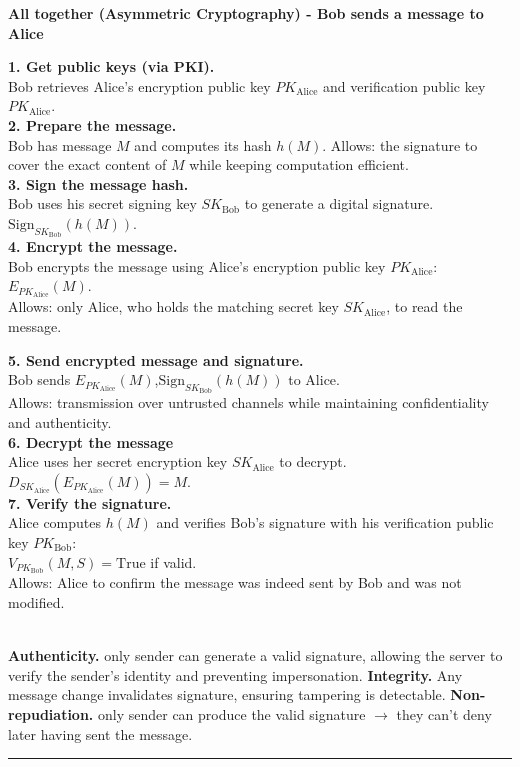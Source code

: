 \documentclass[9pt, a4paper]{extarticle}
\makeatletter
\renewcommand{\hline}{\noalign{\vskip 2px}\hrule\@height\arrayrulewidth\@width\linewidth\noalign{\vskip 2px}}
\makeatother
\begin{document}
\begin{minipage}[t]{0.495\textwidth}
	\textbf{All together (Asymmetric Cryptography) - Bob sends a message to Alice}\\
	\begin{minipage}[t]{0.49\textwidth}
		\textbf{1. Get public keys (via PKI).}\\
		Bob retrieves Alice’s encryption public key $PK_{\text{Alice}}$ and verification public key $PK_{\text{Alice}}$.\\
		\textbf{2. Prepare the message.}\\
		Bob has message $M$ and computes its hash $h(M)$.
		Allows: the signature to cover the exact content of $M$ while keeping computation efficient.\\
		\textbf{3. Sign the message hash.}\\
		Bob uses his secret signing key $SK_{\text{Bob}}$ to generate a digital signature. $\text{Sign}_{SK_{\text{Bob}}}(h(M))$.\\
		\textbf{4. Encrypt the message.}\\
		Bob encrypts the message using Alice’s encryption public key $PK_{\text{Alice}}$: $E_{PK_{\text{Alice}}}(M)$.\\
		Allows: only Alice, who holds the matching secret key $SK_{\text{Alice}}$, to read the message.
	\end{minipage}\hfill
	\begin{minipage}[t]{0.49\textwidth}
		\textbf{5. Send encrypted message and signature.}\\
		Bob sends $E_{PK_{\text{Alice}}}(M)$,$\text{Sign}_{SK_{\text{Bob}}}(h(M))$ to Alice.\\
		Allows: transmission over untrusted channels while maintaining confidentiality and authenticity.\\
		\textbf{6. Decrypt the message}\\
		Alice uses her secret encryption key $SK_{\text{Alice}}$ to decrypt. $D_{SK_{\text{Alice}}}(E_{PK_{\text{Alice}}}(M)) = M$.\\
		\textbf{7. Verify the signature.}\\
		Alice computes $h(M)$ and verifies Bob’s signature with his verification public key $PK_{\text{Bob}}$:\\
		$V_{PK_{\text{Bob}}}(M, S) = \text{True}$ if valid.\\
		Allows: Alice to confirm the message was indeed sent by Bob and was not modified.
	\end{minipage}\\
	\textbf{Authenticity.} only sender can generate a valid signature, allowing the server to verify the sender’s identity and preventing impersonation. \textbf{Integrity.} Any message change invalidates signature, ensuring tampering is detectable. \textbf{Non-repudiation.} only sender can produce the valid signature $\rightarrow$ they can't deny later having sent the message.	\hline

\end{minipage}
\end{document}
